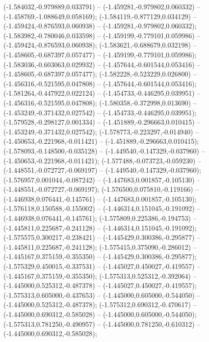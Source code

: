  (-1.584032,-0.979889,0.033791) -- (-1.459281,-0.979802,0.060332) -- (-1.458769,-1.088649,0.058169);
 (-1.584119,-0.877129,0.034129) -- (-1.459424,-0.876593,0.060938) -- (-1.459281,-0.979802,0.060332);
 (-1.583982,-0.780046,0.033598) -- (-1.459199,-0.779101,0.059986) -- (-1.459424,-0.876593,0.060938);
 (-1.583621,-0.688679,0.032198) -- (-1.458605,-0.687397,0.057477) -- (-1.459199,-0.779101,0.059986);
 (-1.583036,-0.603063,0.029932) -- (-1.457644,-0.601544,0.053416) -- (-1.458605,-0.687397,0.057477);
 (-1.582228,-0.523229,0.026800) -- (-1.456316,-0.521595,0.047808) -- (-1.457644,-0.601544,0.053416);
 (-1.581264,-0.447922,0.022124) -- (-1.454733,-0.446295,0.039951) -- (-1.456316,-0.521595,0.047808);
 (-1.580358,-0.372998,0.013690) -- (-1.453249,-0.371432,0.027542) -- (-1.454733,-0.446295,0.039951);
 (-1.579528,-0.298127,0.001334) -- (-1.451889,-0.296663,0.010415) -- (-1.453249,-0.371432,0.027542);
 (-1.578773,-0.223297,-0.014940) -- (-1.450653,-0.221968,-0.011421) -- (-1.451889,-0.296663,0.010415);
 (-1.578093,-0.148500,-0.035128) -- (-1.449540,-0.147329,-0.037960) -- (-1.450653,-0.221968,-0.011421);
 (-1.577488,-0.073723,-0.059230) -- (-1.448551,-0.072727,-0.069197) -- (-1.449540,-0.147329,-0.037960);
 (-1.576957,0.001044,-0.087242) -- (-1.447683,0.001857,-0.105130) -- (-1.448551,-0.072727,-0.069197);
 (-1.576500,0.075810,-0.119166) -- (-1.446938,0.076441,-0.145761) -- (-1.447683,0.001857,-0.105130);
 (-1.576118,0.150588,-0.155002) -- (-1.446314,0.151045,-0.191092) -- (-1.446938,0.076441,-0.145761);
 (-1.575809,0.225386,-0.194753) -- (-1.445811,0.225687,-0.241128) -- (-1.446314,0.151045,-0.191092);
 (-1.575575,0.300217,-0.238421) -- (-1.445429,0.300386,-0.295877) -- (-1.445811,0.225687,-0.241128);
 (-1.575415,0.375090,-0.286012) -- (-1.445167,0.375159,-0.355350) -- (-1.445429,0.300386,-0.295877);
 (-1.575329,0.450015,-0.337531) -- (-1.445027,0.450027,-0.419557) -- (-1.445167,0.375159,-0.355350);
 (-1.575313,0.525312,-0.392064) -- (-1.445000,0.525312,-0.487378) -- (-1.445027,0.450027,-0.419557);
 (-1.575313,0.605000,-0.437653) -- (-1.445000,0.605000,-0.544050) -- (-1.445000,0.525312,-0.487378);
 (-1.575312,0.690312,-0.470617) -- (-1.445000,0.690312,-0.585028) -- (-1.445000,0.605000,-0.544050);
 (-1.575313,0.781250,-0.490957) -- (-1.445000,0.781250,-0.610312) -- (-1.445000,0.690312,-0.585028);
